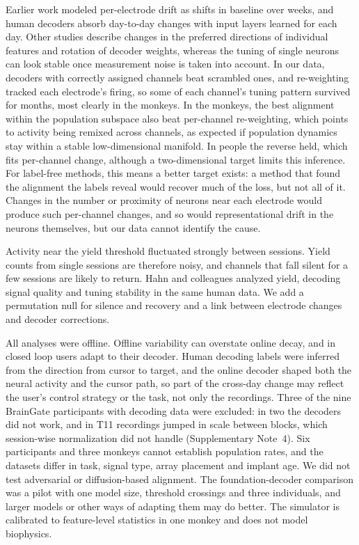 \documentclass[pdflatex,sn-nature]{sn-jnl}
\begin{document}
Earlier work modeled per-electrode drift as shifts in baseline over weeks\cite{bishop2014,jarosiewicz2015}, and human
decoders absorb day-to-day changes with input layers learned for each day\cite{willett2021,fan2023}. Other studies
describe changes in the preferred directions of individual features\cite{pun2024} and rotation of decoder
weights\cite{wilson2025}, whereas the tuning of single neurons can look stable once measurement noise is taken into
account\cite{stevenson2011}. In our data, decoders with correctly assigned channels beat scrambled ones, and re-weighting
tracked each electrode's firing, so some of each channel's tuning pattern survived for months, most clearly in the
monkeys. In the monkeys, the best alignment within the population subspace also beat per-channel re-weighting, which
points to activity being remixed across channels, as expected if population dynamics stay within a stable
low-dimensional manifold\cite{gallego2018,gallego2020,safaie2023}. In people the reverse held, which fits per-channel change, although
a two-dimensional target limits this inference. For label-free methods, this means a better target exists: a method
that found the alignment the labels reveal would recover much of the loss, but not all of it. Changes in the number or
proximity of neurons near each electrode would produce such per-channel changes\cite{polikov2005,kozai2015}, and so
would representational drift in the neurons themselves\cite{driscoll2022,natraj2025}, but our data cannot identify the
cause.

Activity near the yield threshold fluctuated strongly between sessions. Yield counts from single sessions are therefore
noisy, and channels that fall silent for a few sessions are likely to return. Hahn and colleagues analyzed yield,
decoding signal quality and tuning stability in the same human data\cite{hahn2026}. We add a permutation null for
silence and recovery and a link between electrode changes and decoder corrections.

All analyses were offline. Offline variability can overstate online decay\cite{flint2013}, and in closed loop users
adapt to their decoder\cite{gilja2012}. Human decoding labels were inferred from the direction from cursor to target\cite{jarosiewicz2013},
and the online decoder shaped both the neural activity and the cursor path, so part of the cross-day change may reflect
the user's control strategy or the task, not only the recordings. Three of the nine BrainGate participants with
decoding data were excluded: in two the decoders did not work, and in T11 recordings jumped in scale between blocks,
which session-wise normalization did not handle (Supplementary Note~4). Six participants and three monkeys cannot
establish population rates, and the datasets differ in task, signal type, array placement and implant age. We did not
test adversarial or diffusion-based alignment. The foundation-decoder comparison was a pilot with one model size, threshold crossings and
three individuals, and larger models or other ways of adapting them may do better. The simulator is calibrated to
feature-level statistics in one monkey and does not model biophysics.
\end{document}
